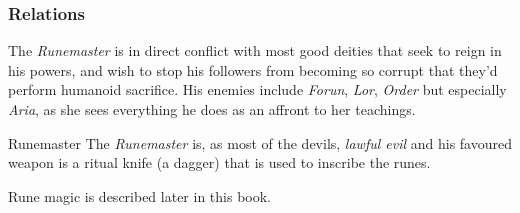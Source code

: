 \subsubsection{Relations}

The \emph{Runemaster} is in direct conflict with most good deities that seek
to reign in his powers, and wish to stop his followers from becoming so corrupt
that they'd perform humanoid sacrifice. His enemies include \emph{Forun},
\emph{Lor}, \emph{Order} but especially \emph{Aria}, as she sees everything he
does as an affront to her teachings.

\begin{35e}{Runemaster}
  The \emph{Runemaster} is, as most of the devils, \emph{lawful evil} and his
  favoured weapon is a ritual knife (a dagger) that is used to inscribe the
  runes.

  Rune magic is described later in this book.
\end{35e}
